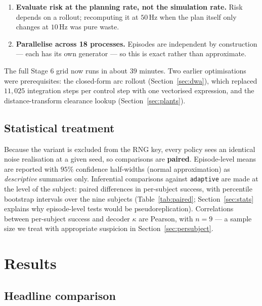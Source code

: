 \documentclass[11pt,a4paper]{article}
\newcommand{\vadapt}{\texttt{adaptive}}
\theoremstyle{plain}
\theoremstyle{definition}
\begin{document}
\begin{enumerate}
\item \textbf{Evaluate risk at the planning rate, not the simulation
      rate.} Risk depends on a rollout; recomputing it at $50$\,Hz when
      the plan itself only changes at $10$\,Hz was pure waste.
\item \textbf{Parallelise across 18 processes.} Episodes are independent
      by construction --- each has its own generator --- so this is
      exact rather than approximate.
\end{enumerate}

The full Stage 6 grid now runs in about $39$ minutes. Two earlier
optimisations were prerequisites: the closed-form arc rollout
(Section~\ref{sec:dwa}), which replaced $11{,}025$ integration steps per
control step with one vectorised expression, and the distance-transform
clearance lookup (Section~\ref{sec:plants}).

\subsection{Statistical treatment}

Because the variant is excluded from the RNG key, every policy sees an
identical noise realisation at a given seed, so comparisons are
\textbf{paired}. Episode-level means are reported with $95\%$
confidence half-widths (normal approximation) as \emph{descriptive}
summaries only. Inferential comparisons against \vadapt{} are made at
the level of the subject: paired differences in per-subject success,
with percentile bootstrap intervals over the nine subjects
(Table~\ref{tab:paired}; Section~\ref{sec:stats} explains why
episode-level tests would be pseudoreplication). Correlations between
per-subject success and decoder $\kappa$ are Pearson, with $n = 9$ --- a
sample size we treat with appropriate suspicion in
Section~\ref{sec:persubject}.

\section{Results}
\label{sec:results}

\subsection{Headline comparison}
\end{document}
